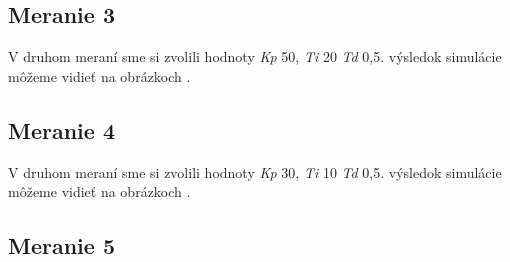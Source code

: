 \documentclass{article}
\begin{document}
\clearpage




\subsection{Meranie 3}
\label{sec:meranie3}

V druhom meraní sme si zvolili hodnoty \textit{Kp} 50, \textit{Ti} 20 \textit{Td} 0,5. výsledok simulácie môžeme vidieť na obrázkoch  .


\clearpage



\subsection{Meranie 4}
\label{sec:meranie4}

V druhom meraní sme si zvolili hodnoty \textit{Kp} 30, \textit{Ti} 10 \textit{Td} 0,5. výsledok simulácie môžeme vidieť na obrázkoch  .


\clearpage

\subsection{Meranie 5}
\label{sec:meranie5}
\end{document}
